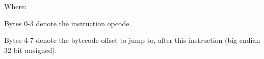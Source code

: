 Where:

Bytes 0-3 denote the instruction opcode.

Bytes 4-7 denote the bytecode offset to jump to, after
this instruction (big endian 32 bit unsigned).
